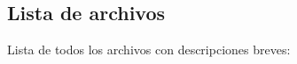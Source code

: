 \subsection{Lista de archivos}
Lista de todos los archivos con descripciones breves\+:\begin{DoxyCompactList}
\item{}
\item{}
\end{DoxyCompactList}
